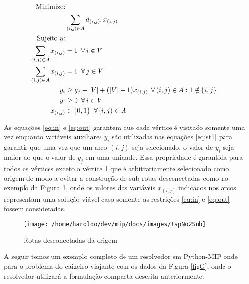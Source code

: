 \documentclass[a4paper,11pt,fleqn]{article}
\begin{document}
\begin{align}
\textrm{Minimize:}\nonumber \\
& \sum_{(i,j)\in A}d_{(i,j)}\ldotp x_{(i,j)}\nonumber \\
\textrm{Sujeito a:}\nonumber \\
\sum_{(i,j)\in A}x_{(i,j)} & =1\,\,\,\forall\,i\in V\label{eq:in}\\
\sum_{(i,j)\in A}x_{(i,j)} & =1\,\,\,\forall\,j\in V\label{eq:out}\\
y_{i} & \geq y_{j}-|V|+(|V|+1)x_{(i,j)}\,\,\,\forall\,(i,j)\in A:1\notin\{i,j\}\label{eq:st1}\\
y_{i} & \geq0\,\,\,\forall\,i\in V\label{eq:y}\\
x_{(i,j)} & \in\{0,1\}\,\,\,\forall\,(i,j)\in A\label{eq:x}
\end{align}

As equações \ref{eq:in} e \ref{eq:out} garantem que cada vértice
é visitado somente uma vez enquanto variáveis auxiliares $y_{i}$
são utilizadas nas equações \ref{eq:st1} para garantir que uma vez
que um arco $(i,j)$ seja selecionado, o valor de $y_{i}$ seja maior
do que o valor de $y_{j}$ em uma unidade. Essa propriedade é garantida
para todos os vértices exceto o vértice 1 que é arbitrariamente selecionado
como origem de modo a evitar a construção de sub-rotas desconectadas
como no exemplo da Figura \ref{figSub}, onde os valores das variáveis
$x_{(i,j)}$ indicados nos arcos representam uma solução viável caso
somente as restrições \ref{eq:in} e \ref{eq:out} fossem consideradas.

\begin{figure}
	\begin{centering}
		\texttt{[image: /home/haroldo/dev/mip/docs/images/tspNo2Sub]}
		\par\end{centering}
	\caption{Rotas desconectadas da origem}
	\label{figSub}
	
\end{figure}

A seguir temos um exemplo completo de um resolvedor em Python-MIP onde para o problema do caixeiro viajante com os dados da Figura \ref{figG}, onde o resolvedor utilizará a formulação compacta descrita anteriormente:
\end{document}
